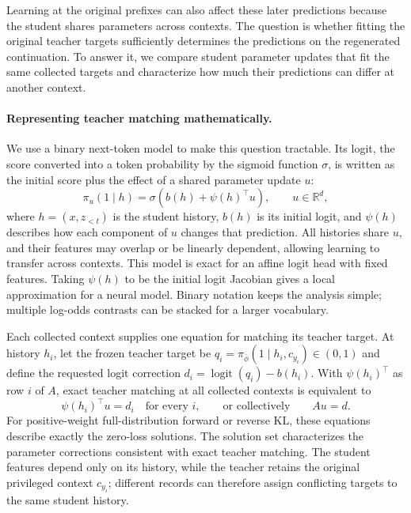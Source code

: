Learning at the original prefixes can also affect these later predictions because the student shares parameters across contexts. The question is whether fitting the original teacher targets sufficiently determines the predictions on the regenerated continuation. To answer it, we compare student parameter updates that fit the same collected targets and characterize how much their predictions can differ at another context.

\paragraph{Representing teacher matching mathematically.} We use a binary next-token model to make this question tractable. Its logit, the score converted into a token probability by the sigmoid function $\sigma$, is written as the initial score plus the effect of a shared parameter update $u$:
\begin{equation}
\pi_u(1\mid h)=\sigma\!\left(b(h)+\psi(h)^\top u\right),
\qquad u\in\mathbb R^d,
\label{eq:ident-model}
\end{equation}
where $h=(x,z_{<t})$ is the student history, $b(h)$ is its initial logit, and $\psi(h)$ describes how each component of $u$ changes that prediction. All histories share $u$, and their features may overlap or be linearly dependent, allowing learning to transfer across contexts. This model is exact for an affine logit head with fixed features. Taking $\psi(h)$ to be the initial logit Jacobian gives a local approximation for a neural model. Binary notation keeps the analysis simple; multiple log-odds contrasts can be stacked for a larger vocabulary.

Each collected context supplies one equation for matching its teacher target. At history $h_i$, let the frozen teacher target be $q_i=\pi_{\bar\phi}(1\mid h_i,c_{y_i})\in(0,1)$ and define the requested logit correction $d_i=\operatorname{logit}(q_i)-b(h_i)$. With $\psi(h_i)^\top$ as row $i$ of $A$, exact teacher matching at all collected contexts is equivalent to
\[
\psi(h_i)^\top u=d_i\quad\text{for every }i,
\qquad\text{or collectively}\qquad Au=d.
\]
For positive-weight full-distribution forward or reverse KL, these equations describe exactly the zero-loss solutions. The solution set characterizes the parameter corrections consistent with exact teacher matching. The student features depend only on its history, while the teacher retains the original privileged context $c_{y_i}$; different records can therefore assign conflicting targets to the same student history.

